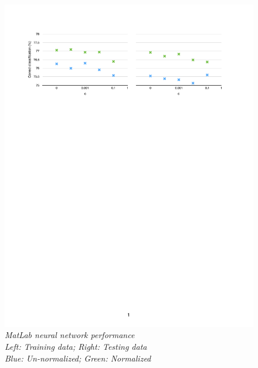 \documentclass{article} %
\begin{document}
\begin                  {figure}
\begin                  {center}
\includegraphics        [scale = 0.6]
                        {fig2.pdf}
\caption                {\small\textit{MatLab neural network performance\\Left: Training data; Right: Testing data\\Blue: Un-normalized; Green: Normalized}}
\label                  {fig:fig2}
\end                    {center}
\end                    {figure}
\end{document}
